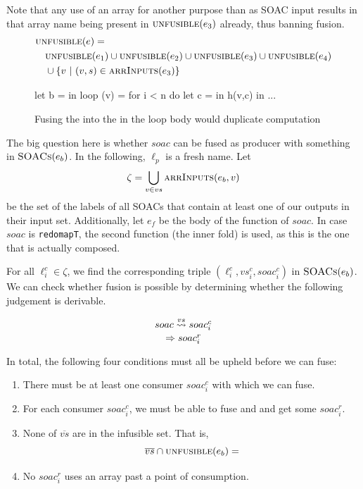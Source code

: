 \begin{description}[style=nextline]
  Note that any use of an array for another purpose than as SOAC input
  results in that array name being present in $\textsc{unfusible}(e_{3})$
  already, thus banning fusion.
\begin{align*}
  & \textsc{unfusible}(e) =\\
  & \quad \textsc{unfusible}(e_{1}) \cup \textsc{unfusible}(e_{2}) \cup \textsc{unfusible}(e_{3}) \cup \textsc{unfusible}(e_{4}) \\
  & \quad \cup \{ v\ |\ (v,s) \in \textsc{arrInputs}(e_{3}) \}
\end{align*}

\begin{figure}
\begin{center}
\begin{bcolorcode}
let b =  in
loop (v) = for i < n do
             let c =  in
             h(v,c) in
...
\end{bcolorcode}
\end{center}
\caption{Fusing the  into the  in the loop body would duplicate computation}
\label{fig:cannot-fuse-loop}
\end{figure}

\item[Case $e \equiv \texttt{let \{$\overline{vs}$\} = $soac$ in $e_{b}$}$]

  The big question here is whether $soac$ can be fused as producer
  with something in $\textsc{SOACs}(e_{b})$.  In the following, $\ell_{p}$ is
  a fresh name.  Let
  \[
  \zeta = \bigcup_{v \in vs} \textsc{arrInputs}(e_{b},v)
  \]
  be the set of the labels of all SOACs that contain at least one of
  our outputs in their input set.  Additionally, let $e_{f}$ be the
  body of the function of $soac$.  In case $soac$ is
  \texttt{redomapT}, the second function (the inner fold) is used, as
  this is the one that is actually composed.

  For all $\ell^{c}_{i} \in \zeta$, we find the corresponding triple
  $(\ell^{c}_{i},vs^{c}_{i},soac^{c}_{i})$ in $\textsc{SOACs}(e_{b})$.  We can check
  whether fusion is possible by determining whether the following
  judgement is derivable.

\[
   \fusesto
    {vs}
    {soac}
    {soac^{c}_{i}}
    {soac^{r}_{i}}
\]

In total, the following four conditions must all be upheld before we
can fuse:

\begin{enumerate}
\item There must be at least one consumer $soac^{c}_{i}$ with which we can fuse.
\item For each consumer $soac^{c}_{i}$, we must be able to fuse and
  and get some $soac^{r}_{i}$.
\item None of $\overline{vs}$ are in the infusible set.  That is,
\[
\overline{vs} \cap \infusible(e_{b}) = \empty
\]
\item No $soac^{r}_{i}$ uses an array past a point of consumption. 
\end{enumerate}


\end{description}

